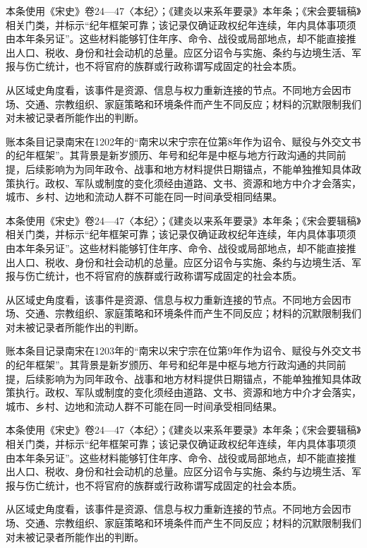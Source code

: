 本条使用《宋史》卷24—47〈本纪〉；《建炎以来系年要录》本年条；《宋会要辑稿》相关门类，并标示“纪年框架可靠；该记录仅确证政权纪年连续，年内具体事项须由本年条另证”。这些材料能够钉住年序、命令、战役或局部地点，却不能直接推出人口、税收、身份和社会动机的总量。应区分诏令与实施、条约与边境生活、军报与伤亡统计，也不将官府的族群或行政称谓写成固定的社会本质。

从区域史角度看，该事件是资源、信息与权力重新连接的节点。不同地方会因市场、交通、宗教组织、家庭策略和环境条件而产生不同反应；材料的沉默限制我们对未被记录者所能作出的判断。

账本条目记录南宋在1202年的“南宋以宋宁宗在位第8年作为诏令、赋役与外交文书的纪年框架”。其背景是新岁颁历、年号和纪年是中枢与地方行政沟通的共同前提，后续影响为为同年政令、战事和地方材料提供日期锚点，不能单独推知具体政策执行。政权、军队或制度的变化须经由道路、文书、资源和地方中介才会落实，城市、乡村、边地和流动人群不可能在同一时间承受相同结果。

本条使用《宋史》卷24—47〈本纪〉；《建炎以来系年要录》本年条；《宋会要辑稿》相关门类，并标示“纪年框架可靠；该记录仅确证政权纪年连续，年内具体事项须由本年条另证”。这些材料能够钉住年序、命令、战役或局部地点，却不能直接推出人口、税收、身份和社会动机的总量。应区分诏令与实施、条约与边境生活、军报与伤亡统计，也不将官府的族群或行政称谓写成固定的社会本质。

从区域史角度看，该事件是资源、信息与权力重新连接的节点。不同地方会因市场、交通、宗教组织、家庭策略和环境条件而产生不同反应；材料的沉默限制我们对未被记录者所能作出的判断。

账本条目记录南宋在1203年的“南宋以宋宁宗在位第9年作为诏令、赋役与外交文书的纪年框架”。其背景是新岁颁历、年号和纪年是中枢与地方行政沟通的共同前提，后续影响为为同年政令、战事和地方材料提供日期锚点，不能单独推知具体政策执行。政权、军队或制度的变化须经由道路、文书、资源和地方中介才会落实，城市、乡村、边地和流动人群不可能在同一时间承受相同结果。

本条使用《宋史》卷24—47〈本纪〉；《建炎以来系年要录》本年条；《宋会要辑稿》相关门类，并标示“纪年框架可靠；该记录仅确证政权纪年连续，年内具体事项须由本年条另证”。这些材料能够钉住年序、命令、战役或局部地点，却不能直接推出人口、税收、身份和社会动机的总量。应区分诏令与实施、条约与边境生活、军报与伤亡统计，也不将官府的族群或行政称谓写成固定的社会本质。

从区域史角度看，该事件是资源、信息与权力重新连接的节点。不同地方会因市场、交通、宗教组织、家庭策略和环境条件而产生不同反应；材料的沉默限制我们对未被记录者所能作出的判断。

